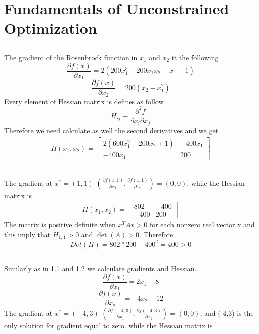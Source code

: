 \documentclass[12pt]{article}
\begin{document}
\section{Fundamentals of Unconstrained Optimization}
\subsection{}
\label{1a}
The gradient of the Rosenbrock function in $x_1$ and $x_2$ it the following
\begin{equation}
\frac{\partial f(x)}{\partial x_1} = 2(200x_1^{3} - 200x_1x_2+x_1-1) 
\end{equation}
\begin{equation}
\frac{\partial f(x)}{\partial x_2} = 200(x_2 - x_1^2)
\end{equation}
Every element of Hessian matrix is defines as follow
\begin{equation}
 H_{ij} \equiv \frac{\partial^{2} f}{\partial x_{i} \partial x_{j} }
\end{equation}
Therefore we need calculate as well the second derivatives and we get
\begin{align}
H(x_1,x_2) = \begin{bmatrix}
2(600x_1^2-200x_2+1) & -400x_1 \\
-400x_1 & 200
\end{bmatrix}
\end{align}
\subsection{}
\label{1b}
The gradient at $x^* = (1,1)$ $(\frac{\partial f(1,1)}{\partial x_1}, \frac{\partial f(1,1)}{\partial x_2})  = (0,0)$, while the Hessian matrix is
\begin{align}
H(x_1,x_2) = \begin{bmatrix}
802 & -400 \\
-400 & 200
\end{bmatrix}
\end{align}
The matrix is positive definite when $x^TAx >0$ for each nonzero real vector x and this imply that  $H_{1,1} > 0$ and  $\det(A) > 0$. Therefore
\begin{equation}
Det(H) = 802*200-400^2 = 400 > 0
\end{equation}
\subsection{}
Similarly as in \ref{1a} and \ref{1b} we calculate gradients and Hessian.
\begin{equation}
\frac{\partial f(x)}{\partial x_1} = 2x_1 + 8
\end{equation}
\begin{equation}
\frac{\partial f(x)}{\partial x_2} = -4x_2+12
\end{equation}
The gradient at $x^* = (-4,3)$ $(\frac{\partial f(-4,3)}{\partial x_1}, \frac{\partial f(-4,3)}{\partial x_2})  = (0,0)$, and (-4,3) is the only solution for gradient equal to zero. while the Hessian matrix is
\end{document}
